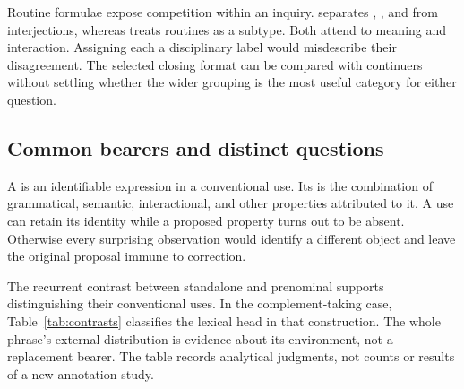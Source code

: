 \documentclass[12pt]{article}
\begin{document}
Routine formulae expose competition within an inquiry.
\textcite[108--110]{ameka1992} separates , ,
and  from interjections, whereas
\textcite[142]{wilkins1992} treats routines as a subtype. Both attend
to meaning and interaction. Assigning each a disciplinary label would
misdescribe their disagreement. The selected closing format can be
compared with continuers without settling whether the wider grouping
is the most useful category for either question.

\subsection{Common bearers and distinct questions}

A  is an identifiable expression in a conventional use.
Its  is the combination of grammatical, semantic, interactional,
and other properties attributed to it. A use can retain its identity
while a proposed property turns out to be absent. Otherwise every
surprising observation would identify a different object and leave the
original proposal immune to correction.

The recurrent contrast between standalone and prenominal 
supports distinguishing their conventional uses. In the complement-taking
case, Table~\ref{tab:contrasts} classifies the lexical head 
in that construction. The whole phrase's external distribution is evidence
about its environment, not a replacement bearer. The table records
analytical judgments, not counts or results of a new annotation study.
\end{document}
